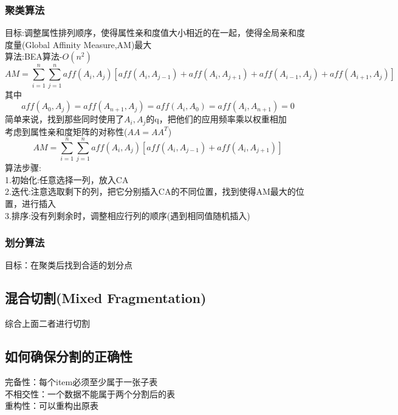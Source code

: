\documentclass{article}
\begin{document}
\begin{CJK}{UTF8}{gbsn}
	\subsubsection*{聚类算法}
	目标:调整属性排列顺序，使得属性亲和度值大小相近的在一起，使得全局亲和度度量(Global Affinity Measure,AM)最大\\
	算法:BEA算法-$O(n^2)$\\
	\begin{equation*}
	AM=\sum_{i=1}^{n}\sum_{j=1}^naff(A_i,A_j)[aff(A_i,A_{j-1})+aff(A_i,A_{j+1})+aff(A_{i-1},A_j)+aff(A_{i+1},A_j)]
	\end{equation*}	
	其中\\
	\begin{equation*}
	aff(A_0,A_j) = aff(A_{n+1},A_j)=aff(A_i,A_0)=aff(A_i,A_{n+1})=0
	\end{equation*}
	简单来说，找到那些同时使用了$A_i,A_j$的q，把他们的应用频率乘以权重相加\\
	考虑到属性亲和度矩阵的对称性($AA=AA^T$)\\
	\begin{equation*}
	AM=\sum_{i=1}^{n}\sum_{j=1}^naff(A_i,A_j)[aff(A_i,A_{j-1})+aff(A_i,A_{j+1})]
	\end{equation*}	
	算法步骤:\\
	1.初始化:任意选择一列，放入CA\\
	2.迭代:注意选取剩下的列，把它分别插入CA的不同位置，找到使得AM最大的位置，进行插入\\
	3.排序:没有列剩余时，调整相应行列的顺序(遇到相同值随机插入)\\
	\subsubsection*{划分算法}
	目标：在聚类后找到合适的划分点\\
	
	
	\subsection*{混合切割(Mixed Fragmentation)}
	综合上面二者进行切割\\
	\subsection*{如何确保分割的正确性}
	完备性：每个item必须至少属于一张子表\\
	不相交性：一个数据不能属于两个分割后的表\\
	重构性：可以重构出原表\\

\end{CJK}
\end{document}

